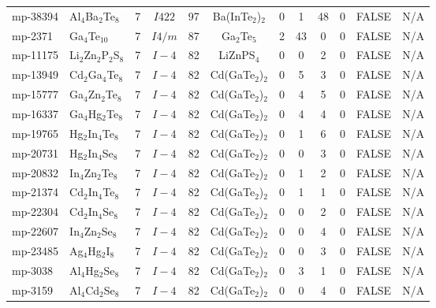{\begin{longtable}{llcccccccccc}
    mp-38394 & Al$_{4}$Ba$_{2}$Te$_{8}$ & 7     & $I422$ & 97    & Ba(InTe$_{2}$)$_{2}$ & 0     & 1     & 48    & 0     & FALSE & N/A \\
    mp-2371 & Ga$_{4}$Te$_{10}$ & 7     & $I4/m$ & 87    & Ga$_{2}$Te$_{5}$ & 2     & 43    & 0     & 0     & FALSE & N/A \\
    mp-11175 & Li$_{2}$Zn$_{2}$P$_{2}$S$_{8}$ & 7     & $I-4$ & 82    & LiZnPS$_{4}$ & 0     & 0     & 2     & 0     & FALSE & N/A \\
    mp-13949 & Cd$_{2}$Ga$_{4}$Te$_{8}$ & 7     & $I-4$ & 82    & Cd(GaTe$_{2}$)$_{2}$ & 0     & 5     & 3     & 0     & FALSE & N/A \\
    mp-15777 & Ga$_{4}$Zn$_{2}$Te$_{8}$ & 7     & $I-4$ & 82    & Cd(GaTe$_{2}$)$_{2}$ & 0     & 4     & 5     & 0     & FALSE & N/A \\
    mp-16337 & Ga$_{4}$Hg$_{2}$Te$_{8}$ & 7     & $I-4$ & 82    & Cd(GaTe$_{2}$)$_{2}$ & 0     & 4     & 4     & 0     & FALSE & N/A \\
    mp-19765 & Hg$_{2}$In$_{4}$Te$_{8}$ & 7     & $I-4$ & 82    & Cd(GaTe$_{2}$)$_{2}$ & 0     & 1     & 6     & 0     & FALSE & N/A \\
    mp-20731 & Hg$_{2}$In$_{4}$Se$_{8}$ & 7     & $I-4$ & 82    & Cd(GaTe$_{2}$)$_{2}$ & 0     & 0     & 3     & 0     & FALSE & N/A \\
    mp-20832 & In$_{4}$Zn$_{2}$Te$_{8}$ & 7     & $I-4$ & 82    & Cd(GaTe$_{2}$)$_{2}$ & 0     & 1     & 2     & 0     & FALSE & N/A \\
    mp-21374 & Cd$_{2}$In$_{4}$Te$_{8}$ & 7     & $I-4$ & 82    & Cd(GaTe$_{2}$)$_{2}$ & 0     & 1     & 1     & 0     & FALSE & N/A \\
    mp-22304 & Cd$_{2}$In$_{4}$Se$_{8}$ & 7     & $I-4$ & 82    & Cd(GaTe$_{2}$)$_{2}$ & 0     & 0     & 2     & 0     & FALSE & N/A \\
    mp-22607 & In$_{4}$Zn$_{2}$Se$_{8}$ & 7     & $I-4$ & 82    & Cd(GaTe$_{2}$)$_{2}$ & 0     & 0     & 4     & 0     & FALSE & N/A \\
    mp-23485 & Ag$_{4}$Hg$_{2}$I$_{8}$ & 7     & $I-4$ & 82    & Cd(GaTe$_{2}$)$_{2}$ & 0     & 0     & 3     & 0     & FALSE & N/A \\
    mp-3038 & Al$_{4}$Hg$_{2}$Se$_{8}$ & 7     & $I-4$ & 82    & Cd(GaTe$_{2}$)$_{2}$ & 0     & 3     & 1     & 0     & FALSE & N/A \\
    mp-3159 & Al$_{4}$Cd$_{2}$Se$_{8}$ & 7     & $I-4$ & 82    & Cd(GaTe$_{2}$)$_{2}$ & 0     & 0     & 4     & 0     & FALSE & N/A \\

\end{longtable}}
